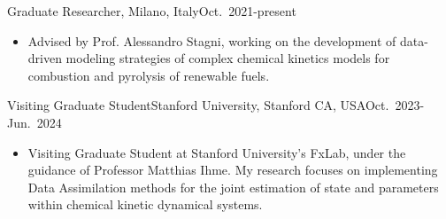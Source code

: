 \begin{position}{Graduate Researcher}{\polimi, Milano, Italy}{Oct.~2021-present}
    \begin{itemize}
        \item[ ] Advised by Prof. Alessandro Stagni, working on the development of
              data-driven modeling strategies of complex chemical kinetics models for
              combustion and pyrolysis of renewable fuels.
    \end{itemize}
\end{position}

\begin{position}{Visiting Graduate Student}{Stanford University, Stanford CA, USA}{Oct.~2023-Jun.~2024}
    \begin{itemize}
        \item[ ] Visiting Graduate Student at Stanford University's FxLab, under the guidance of
              Professor Matthias Ihme. My research focuses on implementing Data Assimilation
              methods for the joint estimation of state and parameters within chemical kinetic
              dynamical systems.
    \end{itemize}
\end{position}
